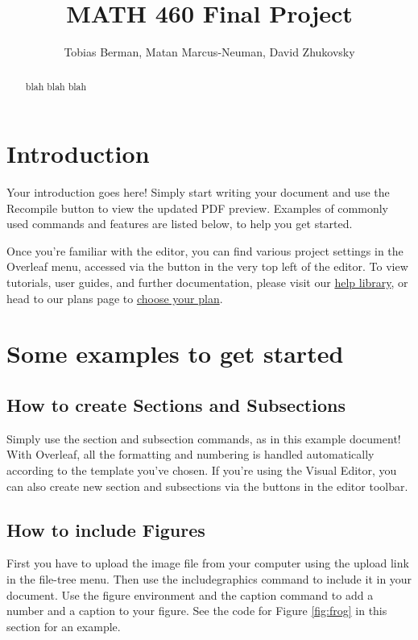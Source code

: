 \documentclass{article}
\title{MATH 460 Final Project}
\author{Tobias Berman, Matan Marcus-Neuman, David Zhukovsky}
\begin{document}
\maketitle

\begin{abstract}
blah blah blah
\end{abstract}

\section{Introduction}

Your introduction goes here! Simply start writing your document and use the Recompile button to view the updated PDF preview. Examples of commonly used commands and features are listed below, to help you get started.

Once you're familiar with the editor, you can find various project settings in the Overleaf menu, accessed via the button in the very top left of the editor. To view tutorials, user guides, and further documentation, please visit our \href{https://www.overleaf.com/learn}{help library}, or head to our plans page to \href{https://www.overleaf.com/user/subscription/plans}{choose your plan}.

\section{Some examples to get started}

\subsection{How to create Sections and Subsections}

Simply use the section and subsection commands, as in this example document! With Overleaf, all the formatting and numbering is handled automatically according to the template you've chosen. If you're using the Visual Editor, you can also create new section and subsections via the buttons in the editor toolbar.

\subsection{How to include Figures}

First you have to upload the image file from your computer using the upload link in the file-tree menu. Then use the includegraphics command to include it in your document. Use the figure environment and the caption command to add a number and a caption to your figure. See the code for Figure \ref{fig:frog} in this section for an example.
\end{document}
